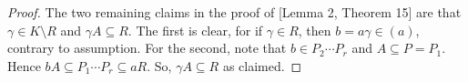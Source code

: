 \begin{proof}
	The two remaining claims in the proof of [Lemma 2, Theorem 15] are that $\gamma \in K \setminus R$ and $\gamma A \subseteq R$. The first is clear, for if $\gamma \in R$, then $b = a\gamma \in (a)$, contrary to assumption. For the second, note that $b \in P_2 \cdots P_r$ and $A \subseteq P = P_1$. Hence $bA \subseteq P_1 \cdots P_r \subseteq aR$. So, $\gamma A \subseteq R$ as claimed.
\end{proof}
